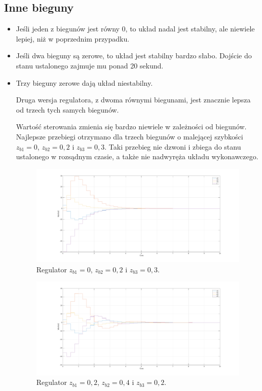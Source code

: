 \subsection{Inne bieguny}
\begin{itemize}
\item Jeśli jeden z biegunów jest równy 0, to układ nadal jest stabilny, ale niewiele lepiej, niż w poprzednim przypadku.
\item Jeśli dwa bieguny są zerowe, to układ jest stabilny bardzo słabo. Dojście do stanu ustalonego zajmuje mu ponad 20 sekund.
\item Trzy bieguny zerowe dają układ niestabilny.

Druga wersja regulatora, z dwoma równymi biegunami, jest znacznie lepsza od trzech tych samych biegunów.

Wartość sterowania zmienia się bardzo niewiele w zależności od biegunów. 
Najlepsze przebiegi otrzymano dla trzech biegunów o malejącej szybkości $z_{b1}=0$, $z_{b2}=0,2$ i $z_{b3}=0,3$.
Taki przebieg nie dzwoni i zbiega do stanu ustalonego w rozsądnym czasie, a także nie nadwyręża układu wykonawczego.

\begin{figure}[H]
\centering
 \includegraphics[width=\textwidth]{img/plot5_3.pdf}
\caption{Regulator $z_{b1}=0$, $z_{b2}=0,2$ i $z_{b3}=0,3$.}
\end{figure}

\begin{figure}[H]
\centering
 \includegraphics[width=\textwidth]{img/plot5_4.pdf}
\caption{Regulator $z_{b1}=0,2$, $z_{b2}=0,4$ i $z_{b3}=0,2$.}
\end{figure}


\end{itemize}
